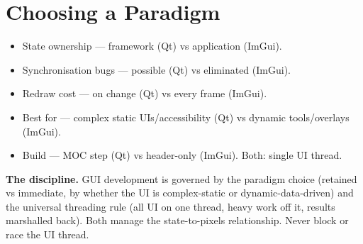 \section{Choosing a Paradigm}
\begin{itemize}
\item State ownership --- framework (Qt) vs application (ImGui).
\item Synchronisation bugs --- possible (Qt) vs eliminated (ImGui).
\item Redraw cost --- on change (Qt) vs every frame (ImGui).
\item Best for --- complex static UIs/accessibility (Qt) vs dynamic tools/overlays (ImGui).
\item Build --- MOC step (Qt) vs header-only (ImGui). Both: single UI thread.
\end{itemize}

\textbf{The discipline.} GUI development is governed by the paradigm choice (retained vs immediate, by whether the UI is complex-static or dynamic-data-driven) and the universal threading rule (all UI on one thread, heavy work off it, results marshalled back). Both manage the state-to-pixels relationship. Never block or race the UI thread.
